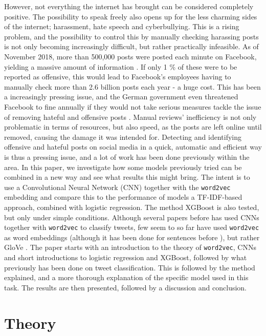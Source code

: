 \documentclass[twocolumn]{article}
\begin{document}
However, not everything the internet has brought can be considered completely positive. The possibility to speak freely also opens up for the less charming sides of the internet; harassment, hate speech and cyberbullying. This is a rising problem, and the possibility to control this by manually checking harassing posts is not only becoming increasingly difficult, but rather practically infeasible. As of November 2018, more than 500,000 posts were posted each minute on Facebook, yielding a massive amount of information \cite{zeph}. If only 1 \% of these were to be reported as offensive, this would lead to Facebook's employees having to manually check more than 2.6 billion posts each year - a huge cost. This has been a increasingly pressing issue, and the German government even threatened Facebook to fine  annually if they would not take serious measures tackle the issue of removing hateful and offensive posts \cite{EThomasson}. Manual reviews' inefficiency is not only problematic in terms of resources, but also speed, as the posts are left online until removed, causing the damage it was intended for. Detecting and identifying offensive and hateful posts on social media in a quick, automatic and efficient way is thus a pressing issue, and a lot of work has been done previously within the area. In this paper, we investigate how some models previously tried can be combined in a new way and see what results this might bring. The intent is to use a Convolutional Neural Network (CNN) together with the \verb|word2vec| embedding and compare this to the performance of models a TF-IDF-based approach, combined with logistic regression. The method XGBoost is also tested, but only under simple conditions. Although several papers before has used CNNs together with \verb|word2vec| to classify tweets, few seem to so far have used \verb|word2vec| as word embeddings (although it has been done for sentences before \cite{KimYoon}), but rather GloVe \cite{2018HateSD, DLNN, Gambck2017}. The paper starts with an introduction to the theory of \verb|word2vec|, CNNs and short introductions to logistic regression and XGBoost, followed by what previously has been done on tweet classification. This is followed by the method explained, and a more thorough explanation of the specific model used in this task. The results are then presented, followed by a discussion and conclusion. 

\section{Theory}
\end{document}
